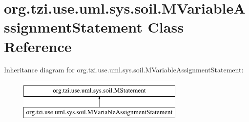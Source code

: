 \hypertarget{classorg_1_1tzi_1_1use_1_1uml_1_1sys_1_1soil_1_1_m_variable_assignment_statement}{\section{org.\-tzi.\-use.\-uml.\-sys.\-soil.\-M\-Variable\-Assignment\-Statement Class Reference}
\label{classorg_1_1tzi_1_1use_1_1uml_1_1sys_1_1soil_1_1_m_variable_assignment_statement}
}
Inheritance diagram for org.\-tzi.\-use.\-uml.\-sys.\-soil.\-M\-Variable\-Assignment\-Statement\-:\begin{figure}[H]
\begin{center}
\leavevmode
\includegraphics[height=2.000000cm]{classorg_1_1tzi_1_1use_1_1uml_1_1sys_1_1soil_1_1_m_variable_assignment_statement}
\end{center}
\end{figure}
